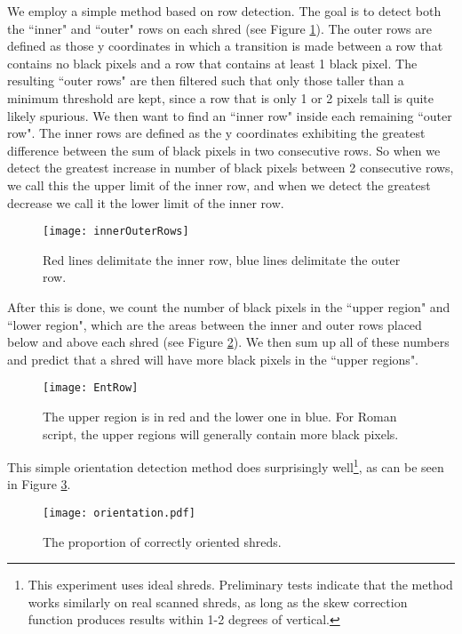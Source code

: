 We employ a simple method based on row detection. The goal is to detect both the ``inner" and ``outer" rows on each shred (see Figure \ref{fig:rows}). The outer rows are defined as those y coordinates in which a transition is made between a row that contains no black pixels and a row that contains at least 1 black pixel. The resulting ``outer rows" are then filtered such that only those taller than a minimum threshold are kept, since a row that is only 1 or 2 pixels tall is quite likely spurious. We then want to find an ``inner row" inside each remaining ``outer row". The inner rows are defined as the y coordinates exhibiting the greatest difference between the sum of black pixels in two consecutive rows. So when we detect the greatest increase in number of black pixels between 2 consecutive rows, we call this the upper limit of the inner row, and when we detect the greatest decrease we call it the lower limit of the inner row.

\begin{figure}[h]
    \centering
    \texttt{[image: innerOuterRows]}
    \caption{Red lines delimitate the inner row, blue lines delimitate the outer row.}
    \label{fig:rows}
\end{figure}

After this is done, we count the number of black pixels in the ``upper region" and ``lower region", which are the areas between the inner and outer rows placed below and above each shred (see Figure \ref{fig:regions}). We then sum up all of these numbers and predict that a shred will have more black pixels in the ``upper regions".

\begin{figure}[h]
    \centering
    \texttt{[image: EntRow]}
    \caption{The upper region is in red and the lower one in blue. For Roman script, the upper regions will generally contain more black pixels.}
    \label{fig:regions}
\end{figure}

This simple orientation detection method does surprisingly well\footnote{This experiment uses ideal shreds. Preliminary tests indicate that the method works similarly on real scanned shreds, as long as the skew correction function produces results within 1-2 degrees of vertical.}, as can be seen in Figure \ref{fig:orientation}.

\begin{figure}[h]
    \centering
    \texttt{[image: orientation.pdf]}
    \caption{The proportion of correctly oriented shreds.}
    \label{fig:orientation}
\end{figure}

